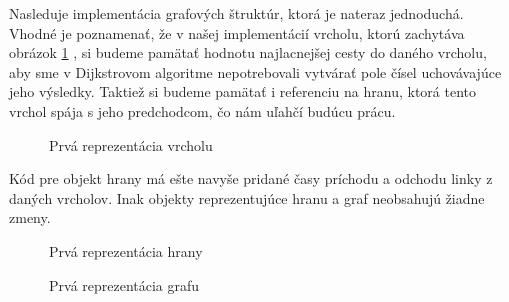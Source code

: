 Nasleduje implementácia grafových štruktúr, ktorá je nateraz jednoduchá. Vhodné je poznamenať, že v našej implementácií vrcholu, ktorú zachytáva obrázok \ref{1_Vertex} , si budeme pamätať hodnotu najlacnejšej cesty do daného vrcholu, aby sme v Dijkstrovom algoritme nepotrebovali vytvárať pole čísel uchovávajúce jeho výsledky. Taktiež si budeme pamätať i referenciu na hranu, ktorá tento vrchol spája s jeho predchodcom, čo nám uľahčí budúcu prácu.\newline

\begin{figure}[H]
\caption{Prvá reprezentácia vrcholu}
\label{1_Vertex}
\end{figure}

Kód pre objekt hrany má ešte navyše pridané časy príchodu a odchodu linky z daných vrcholov. Inak objekty reprezentujúce hranu a graf neobsahujú žiadne zmeny.\newline

\begin{figure}[H]
\caption{Prvá reprezentácia hrany}
\label{1_Edge}
\end{figure}

\begin{figure}[H]
\caption{Prvá reprezentácia grafu}
\label{1_Graph}
\end{figure}

